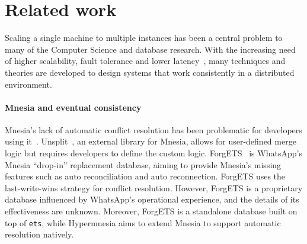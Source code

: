 \section{Related work} \label{sec:eval}



Scaling a single machine to multiple instances has been a central problem to many
of the Computer Science and database research. With the increasing need of higher
scalability, fault tolerance and lower latency~\cite{kleppmann2017DDIA}, many
techniques and theories are developed to design systems that work consistently
in a distributed environment.


\paragraph{Mnesia and eventual consistency}

Mnesia's lack of automatic conflict resolution has been problematic for developers 
using it~\cite{mineiro2008DukesofErl,wiger2010unsplitmail}. 
Unsplit~\cite{wiger2023unsplit}, an external library for Mnesia, allows for user-defined
merge logic but requires developers to define the custom logic.
ForgETS~\cite{vorontsov2018forgETS} is WhatsApp's Mnesia ``drop-in'' replacement
database, aiming to provide Mnesia's missing features such as auto reconciliation and auto
reconnection. ForgETS uses the last-write-wins strategy for conflict resolution.
However, ForgETS is a proprietary database influenced by WhatsApp's operational
experience, and the details of its effectiveness are unknown. Moreover, ForgETS
is a standalone database built on top of \texttt{ets}, while
Hypermnesia aims to extend Mnesia to support automatic resolution natively.


